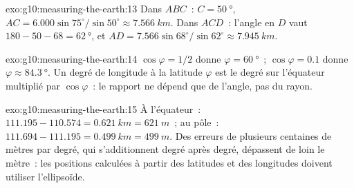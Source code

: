 \begin{solution}{exo:g10:measuring-the-earth:13}
Dans $ABC$~: $C = \qty{50}{\degree}$, $AC = 6.000 \sin 75^\circ/\sin 50^\circ
\approx \qty{7.566}{km}$. Dans $ACD$~: l'angle en $D$ vaut $180 - 50 - 68 =
\qty{62}{\degree}$, et $AD = 7.566 \sin 68^\circ/\sin 62^\circ \approx
\qty{7.945}{km}$.
\end{solution}

\begin{solution}{exo:g10:measuring-the-earth:14}
$\cos\varphi = 1/2$ donne $\varphi = \qty{60}{\degree}$~; $\cos\varphi = 0.1$
donne $\varphi \approx \qty{84.3}{\degree}$. Un degré de longitude à la
latitude $\varphi$ est le degré sur l'équateur multiplié par $\cos\varphi$~:
le rapport ne dépend que de l'angle, pas du rayon.
\end{solution}

\begin{solution}{exo:g10:measuring-the-earth:15}
À l'équateur~: $111.195 - 110.574 = \qty{0.621}{km} = \qty{621}{m}$~; au
pôle~: $111.694 - 111.195 = \qty{0.499}{km} = \qty{499}{m}$. Des erreurs de
plusieurs centaines de mètres par degré, qui s'additionnent degré après
degré, dépassent de loin le mètre~: les positions calculées à partir des
latitudes et des longitudes doivent utiliser l'ellipsoïde.
\end{solution}

